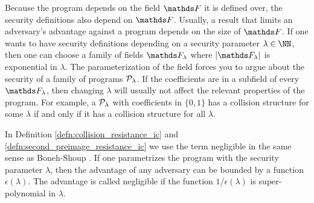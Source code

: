 Because the program depends on the field $\F$ it is defined over,
the security definitions also depend on $\F$.
Usually, a result that limits an adversary's advantage against a program depends on the size of $\F$.
If one wants to have security definitions depending on a security parameter $\lambda \in \NN$,
then one can choose a family of fields $\F_\lambda$ where $|\F_\lambda|$ is exponential in $\lambda$.
The parameterization of the field forces you to argue about the security of a family of programs $\P_\lambda$.
If the coefficients are in a subfield of every $\F_\lambda$,
then changing $\lambda$ will usually not affect the relevant properties of the program.
For example, a $\P_\lambda$ with coefficients in $\{0,1\}$ has a collision structure for some $\lambda$
if and only if it has a collision structure for all $\lambda$.

In Definition \ref{defn:collision_resistance_ic} and \ref{defn:second_preimage_resistance_ic}
we use the term negligible in the same sense as Boneh-Shoup \cite[Section 2.3.1 - 2.3.4]{Boneh2015CourseIA}.
If one parametrizes the program with the security parameter $\lambda$,
then the advantage of any adversary can be bounded by a function $\epsilon(\lambda)$.
The advantage is called negligible if the function $1 / \epsilon(\lambda)$ is super-polynomial in $\lambda$.
